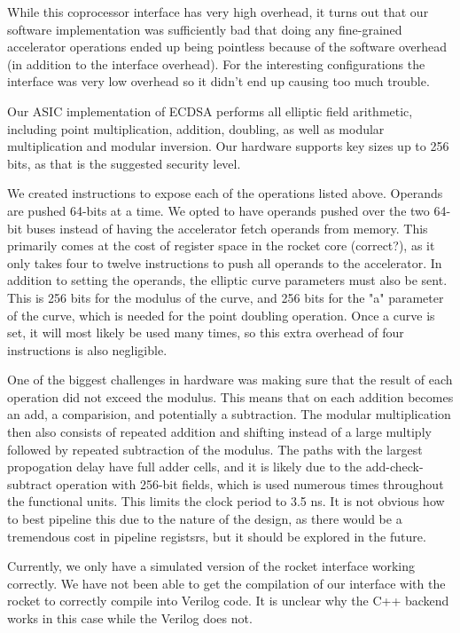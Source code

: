 \documentclass[twocolumn]{article}
\begin{document}
While this coprocessor interface has very high overhead, it turns out
that our software implementation was sufficiently bad that doing any
fine-grained accelerator operations ended up being pointless because
of the software overhead (in addition to the interface overhead).  For
the interesting configurations the interface was very low overhead so
it didn't end up causing too much trouble.

Our ASIC implementation of ECDSA performs all elliptic field arithmetic,
including point multiplication, addition, doubling, as well as modular
multiplication and modular inversion. Our hardware supports key sizes
up to 256 bits, as that is the suggested security level.

We created instructions to expose each of the operations listed
above. Operands are pushed 64-bits at a time. We opted to have
operands pushed over the two 64-bit buses instead of having the
accelerator fetch operands from memory. This primarily comes at the
cost of register space in the rocket core (correct?), as it only takes
four to twelve instructions to push all operands to the
accelerator. In addition to setting the operands, the elliptic curve
parameters must also be sent. This is 256 bits for the modulus of the
curve, and 256 bits for the "a" parameter of the curve, which is
needed for the point doubling operation. Once a curve is set, it will
most likely be used many times, so this extra overhead of four
instructions is also negligible.

One of the biggest challenges in hardware was making sure that the
result of each operation did not exceed the modulus. This means that
on each addition becomes an add, a comparision, and potentially a
subtraction. The modular multiplication then also consists of repeated
addition and shifting instead of a large multiply followed by repeated
subtraction of the modulus. The paths with the largest propogation
delay have full adder cells, and it is likely due to the
add-check-subtract operation with 256-bit fields, which is used
numerous times throughout the functional units. This limits the clock
period to 3.5 ns. It is not obvious how to best pipeline this due to
the nature of the design, as there would be a tremendous cost in
pipeline registsrs, but it should be explored in the future.

Currently, we only have a simulated version of the rocket interface
working correctly.  We have not been able to get the compilation of
our interface with the rocket to correctly compile into Verilog
code. It is unclear why the C++ backend works in this case while the
Verilog does not.
\end{document}

